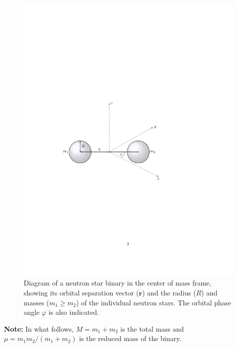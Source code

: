 \documentclass[11pt]{article}
\begin{document}
\begin{figure}[!h]
\begin{mdframed}
\centering
\includegraphics{intro/binary_diagram.pdf}
\caption{\label{fig:binary_diagram}Diagram of a neutron star binary in the center of mass frame, showing its orbital separation vector
($\mathbf{r}$) and the radius ($R$) and masses ($m_1 \geq m_2$) of the individual neutron stars. The orbital phase angle $\varphi$ is also
indicated.}
\end{mdframed}
\end{figure}

\vspace{10pt}

\textbf{Note:} In what follows, $M = m_1 + m_2$ is the total mass and $\mu = m_1 m_2/(m_1 + m_2)$ is the reduced mass of the binary.
\end{document}
